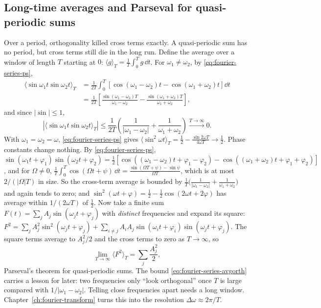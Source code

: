 \subsection{Long-time averages and Parseval for quasi-periodic sums}

Over a period, orthogonality killed cross terms exactly. A quasi-periodic sum has no period, but cross terms still die in the long run. Define the average over a window of length $T$ starting at $0$: $\langle g\rangle_T=\frac1T\int_0^Tg\,\dd t$. For $\omega_1\neq\omega_2$, by \cref{eq:fourier-series-ps},
\begin{align}
\langle\sin\omega_1t\sin\omega_2t\rangle_T&=\frac1{2T}\int_0^T\left[\cos(\omega_1-\omega_2)t-\cos(\omega_1+\omega_2)t\right]\dd t\\
&=\frac1{2T}\left[\frac{\sin(\omega_1-\omega_2)T}{\omega_1-\omega_2}-\frac{\sin(\omega_1+\omega_2)T}{\omega_1+\omega_2}\right],
\end{align}
and since $|\sin|\le1$,
\begin{equation}
\left|\langle\sin\omega_1t\sin\omega_2t\rangle_T\right|\le\frac1{2T}\left(\frac1{|\omega_1-\omega_2|}+\frac1{\omega_1+\omega_2}\right)\xrightarrow{T\to\infty}0 .
\label{eq:fourier-series-avgorth}
\end{equation}
With $\omega_1=\omega_2=\omega$, \cref{eq:fourier-series-ps} gives $\langle\sin^2\omega t\rangle_T=\frac12-\frac{\sin2\omega T}{4\omega T}\to\frac12$. Phase constants change nothing. By \cref{eq:fourier-series-ps}, $\sin(\omega_1t+\varphi_1)\sin(\omega_2t+\varphi_2)=\tfrac12[\cos((\omega_1-\omega_2)t+\varphi_1-\varphi_2)-\cos((\omega_1+\omega_2)t+\varphi_1+\varphi_2)]$, and for $\Omega\neq0$, $\frac1T\int_0^T\cos(\Omega t+\psi)\,\dd t=\frac{\sin(\Omega T+\psi)-\sin\psi}{\Omega T}$, which is at most $2/(|\Omega|T)$ in size. So the cross-term average is bounded by $\frac1T\big(\frac1{|\omega_1-\omega_2|}+\frac1{\omega_1+\omega_2}\big)$ and again tends to zero; and $\sin^2(\omega t+\varphi)=\tfrac12-\tfrac12\cos(2\omega t+2\varphi)$ has average within $1/(2\omega T)$ of $\tfrac12$. Now take a finite sum $F(t)=\sum_jA_j\sin(\omega_jt+\varphi_j)$ with \emph{distinct} frequencies and expand its square: $F^2=\sum_jA_j^2\sin^2(\omega_jt+\varphi_j)+\sum_{i\neq j}A_iA_j\sin(\omega_it+\varphi_i)\sin(\omega_jt+\varphi_j)$. The square terms average to $A_j^2/2$ and the cross terms to zero as $T\to\infty$, so
\begin{equation}
\lim_{T\to\infty}\langle F^2\rangle_T=\sum_j\frac{A_j^2}{2},
\label{eq:fourier-series-parsevalqp}
\end{equation}
Parseval's theorem for quasi-periodic sums. The bound \cref{eq:fourier-series-avgorth} carries a lesson for later: two frequencies only ``look orthogonal'' once $T$ is large compared with $1/|\omega_1-\omega_2|$. Telling close frequencies apart needs a long window. Chapter~\ref{ch:fourier-transform} turns this into the resolution $\Delta\omega\approx2\pi/T$.

